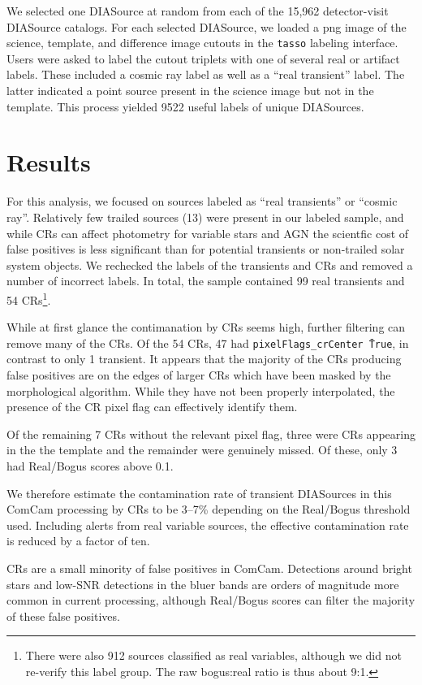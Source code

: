 \documentclass[DM,lsstdraft,authoryear,toc]{lsstdoc}
\begin{document}
We selected one DIASource at random from each of the 15,962 detector-visit DIASource catalogs.
For each selected DIASource, we loaded a png image of the science, template, and difference image cutouts in the \texttt{tasso} labeling interface.
Users were asked to label the cutout triplets with one of several real or artifact labels.
These included a cosmic ray label as well as a ``real transient'' label.
The latter indicated a point source present in the science image but not in the template.
This process yielded 9522 useful labels of unique DIASources.

\section{Results} \label{sec:results}

For this analysis, we focused on sources labeled as ``real transients'' or ``cosmic ray''.
Relatively few trailed sources (13) were present in our labeled sample, and while CRs can affect photometry for variable stars and AGN the scientfic cost of false positives is less significant than for potential transients or non-trailed solar system objects.
We rechecked the labels of the transients and CRs and removed a number of incorrect labels.
In total, the sample contained 99 real transients and 54 CRs\footnote{There were also 912 sources classified as real variables, although we did not re-verify this label group.  
The raw bogus:real ratio is thus about 9:1.}.

While at first glance the contimanation by CRs seems high, further filtering can remove many of the CRs.
Of the 54 CRs, 47 had \texttt{pixelFlags\_crCenter \= True}, in contrast to only 1 transient.
It appears that the majority of the CRs producing false positives are on the edges of larger CRs which have been masked by the morphological algorithm.
While they have not been properly interpolated, the presence of the CR pixel flag can effectively identify them.

Of the remaining 7 CRs without the relevant pixel flag, three were CRs appearing in the the template and the remainder were genuinely missed.
Of these, only 3 had Real/Bogus scores above 0.1.

We therefore estimate the contamination rate of transient DIASources in this ComCam processing by CRs to be 3--7\% depending on the Real/Bogus threshold used.
Including alerts from real variable sources, the effective contamination rate is reduced by a factor of ten.

CRs are a small minority of false positives in ComCam.
Detections around bright stars and low-SNR detections in the bluer bands are orders of magnitude more common in current processing, although Real/Bogus scores can filter the majority of these false positives.
\end{document}
